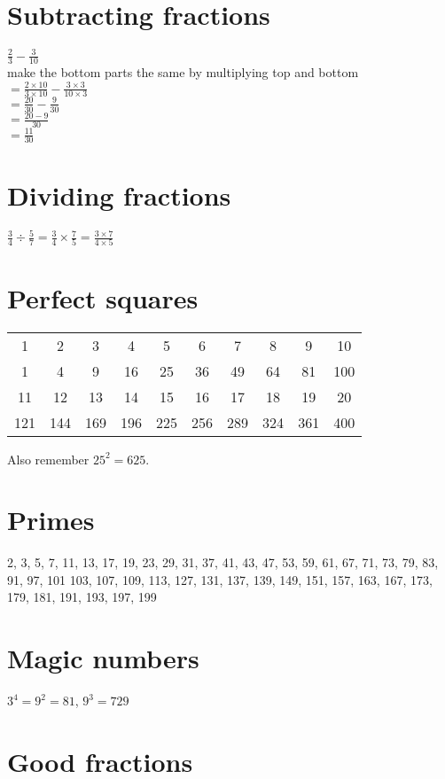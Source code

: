 \documentclass[fullpage,twocolumn]{article}
\begin{document}
\section{Subtracting fractions}
${\frac{2}{3} - \frac{3}{10}}$ \\
make the bottom parts the same by multiplying top and bottom \\
${= \frac{2 \times 10}{ 3 \times 10} - \frac{3 \times 3}{10 \times 3}}$ \\
${ = \frac{20}{30} - \frac{9}{30}}$ \\
${ = \frac{20 - 9 }{30 }} $\\
${ = \frac{11}{30}}$

\section{Dividing fractions}

$\frac{3}{4} \div \frac{5}{7} = \frac{3}{4} \times \frac{7}{5} = \frac{3 \times 7 }{4 \times 5}$

\section{Perfect squares}
{\tiny
\begin{tabular}{|c|c|c|c|c|c|c|c|c|c|} \hline
1 & 2 & 3 & 4 & 5 & 6 & 7 & 8 & 9 & 10 \\ 
1 & 4 & 9 & 16 & 25 & 36 & 49 & 64 & 81 & 100 \\ \hline
11 & 12 & 13 & 14 & 15 & 16 & 17 & 18 & 19 & 20 \\ 
121 & 144 & 169 & 196 & 225 & 256 & 289 & 324 & 361 & 400 \\ \hline
\end{tabular}
}

Also remember $25^2 = 625$.

\section{Primes}
2, 3, 5, 7, 11, 13, 17, 19, 23, 29, 31, 37, 41, 43, 47, 53, 59, 61, 67, 71, 73, 79, 83, 91, 97, 101    103, 107, 109, 113, 127, 131, 137, 139, 149, 151, 157, 163, 167, 173, 179, 181, 191, 193, 197, 199

\section{Magic numbers}
$3^4 = 9^2 = 81$, $9^3 = 729$

\section{Good fractions}
\end{document}
